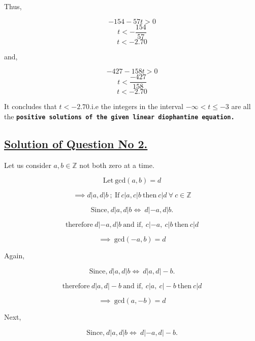 \documentclass[a4paper,12pt]{article}
\begin{document}
    
    \vspace*{0.2mm}

    Thus,

    
    $$-154 - 57t  > 0 $$
    $$t  < -\frac{154}{57} $$
    $$t  < -2.70$$
       
    and,

    $$-427 - 158t  > 0$$
    $$t  < \frac{-427}{158}$$
    $$t  < -2.70$$

    \vspace*{3mm}

    It concludes that $t<-2.70$.i.e the integers in the interval
    $-\infty<t\leq -3$ are all the \texttt{{\bf positive solutions of the given linear diophantine equation.}}

    \pagebreak

    \subsection*{\underline{Solution of Question No 2.}}

    Let us consider $a,b\in \mathbb{Z}$ not both zero at a time.

    \begin{equation*}
        \mbox{Let}\ \mbox{gcd}(a,b) = d \tag{1} 
    \end{equation*}

    $$\implies d|a, d|b\  ;\  \mbox{If}\ c|a, c|b\ \mbox{then}\ c|d\      \forall\ c\in \mathbb{Z} $$

    $$\mbox{Since,}\ d|a, d|b \Longleftrightarrow \ d|-a, d|b.$$

    $$\mbox{therefore}\ d|-a, d|b\  \mbox{and if},\ c|-a,\ c|b\ \mbox{then}\ c|d$$

    \begin{equation*}
        \implies\ \mbox{gcd}(-a,b) = d \tag{2}
    \end{equation*}

    Again,

    $$\mbox{Since,}\ d|a, d|b \Longleftrightarrow \ d|a, d|-b.$$

    $$\mbox{therefore}\ d|a, d|-b\  \mbox{and if},\ c|a,\ c|-b\ \mbox{then}\ c|d$$

    \begin{equation*}
        \implies\ \mbox{gcd}(a,-b) = d \tag{3}
    \end{equation*}

    Next,

    $$\mbox{Since,}\ d|a, d|b \Longleftrightarrow \ d|-a, d|-b.$$
\end{document}
